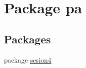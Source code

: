 \hypertarget{namespacepa}{}\section{Package pa}
\label{namespacepa}
\subsection*{Packages}
\begin{DoxyCompactItemize}
\item 
package \mbox{\hyperlink{namespacepa_1_1sesion4}{sesion4}}
\end{DoxyCompactItemize}
